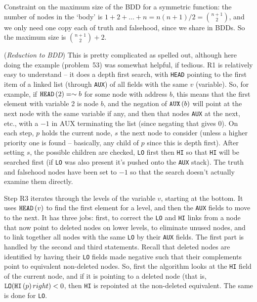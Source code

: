 \vskip 0.08in 

\noindent [p 213] Constraint on the maximum size of the BDD for
a symmetric function: the number of nodes in the `body' is
$1 + 2 + \ldots + n = n \left(n + 1\right) / 2 = {n + 1 \choose 2}$,
and we only need one copy each of truth and falsehood, since
we share in BDDs.  So the maximum size is ${n + 1 \choose 2} + 2$.

\vskip 0.08in  ({\it Reduction to BDD})\hfil\break
This is pretty complicated as spelled out, although here doing
the example (problem~53) was somewhat helpful, if tedious.
R1 is relatively easy to understand -- it does a depth first search,
with {\tt HEAD} pointing to the first item of a linked list (through {\tt AUX})
of all fields with the same $v$ (variable).  So, for example,
if ${\tt HEAD}\left(2\right) = \sim b$ for some node with address $b$,
this means that the first element with variable 2 is node $b$,
and the negation of ${\tt AUX}\left(b\right)$ will point at the next node with the same
variable if any, and then that nodes {\tt AUX} at the next, etc., with
a $-1$ in AUX terminating the list (since negating that gives 0).
On each step, $p$ holds the current node, $s$ the next node to consider
(unless a higher priority one is found -- basically, any child of $p$ since
this is depth first).  After setting $s$, the possible children are checked,
{\tt LO} first then {\tt HI} so that {\tt HI} will be searched first (if {\tt LO}
was also present it's pushed onto the {\tt AUX} stack).  The truth and
falsehood nodes have been set to $-1$ so that the search doesn't
actually examine them directly.

Step R3 iterates through the levels of the variable $v$, starting at
the bottom.  It uses ${\tt HEAD}\left(v\right)$ to find the first element for a 
level, and then the {\tt AUX} fields to move to the next.  It has three jobs:
first, to correct the {\tt LO} and {\tt HI} links from a node that now point
to deleted nodes on lower levels, to eliminate unused nodes,
and to link together all nodes with the same {\tt LO} by their
{\tt AUX} fields.
The first part is handled by the second and third statements.  Recall
that deleted nodes are identified by having their {\tt LO} fields
made negative such that their complements point to equivalent 
non-deleted nodes.  So, first the algorithm looks at the {\tt HI}
field of the current node, and if it is pointing to a deleted node
(that is, ${\tt LO}({\tt HI}\left(p\right)right) < 0$, then {\tt HI}
is repointed at the non-deleted equivalent.  The same is done
for {\tt LO}.  

